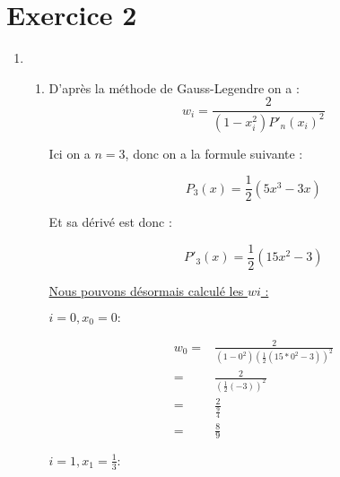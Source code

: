 \documentclass{article}
\begin{document}
\section*{Exercice 2}

\begin{enumerate}

\item

  \begin{enumerate}

  \item

    D'après la méthode de Gauss-Legendre on a :
    \begin{equation*}
      w_i = \frac{2}{(1 - x_i^2) P'_n(x_i)^2}
    \end{equation*}

    Ici on a $n = 3$, donc on a la formule suivante :

    \begin{equation*}
      P_3(x) = \frac{1}{2} (5x^3 - 3x)
    \end{equation*}

    Et sa dérivé est donc :

    \begin{equation*}
      P'_3(x) = \frac{1}{2} (15x^2 - 3)
    \end{equation*}

    \underline{Nous pouvons désormais calculé les $wi$ :} \newline

    $i = 0, x_0 = 0 :$
    
    \begin{equation*}
      \begin{split}
        w_0 = & \frac{2}{(1 - 0^2) \left( \frac{1}{2} (15* 0^2 -
          3) \right)^2} \\
        = & \frac{2}{\left( \frac{1}{2} (- 3) \right)^2} \\
        = & \frac{2}{\frac{9}{4}} \\
        = & \frac{8}{9}
      \end{split}
    \end{equation*}

    $i = 1, x_1 = \frac{1}{3} :$


\end{enumerate}
\end{enumerate}
\end{document}
